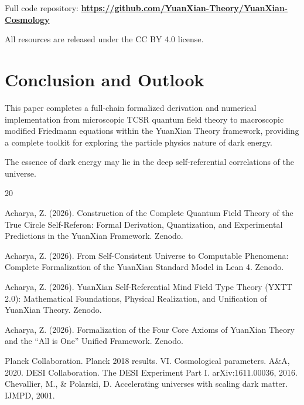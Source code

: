 \documentclass[12pt,a4paper]{article}
\begin{document}
Full code repository:  
\textbf{\url{https://github.com/YuanXian-Theory/YuanXian-Cosmology}}

All resources are released under the CC BY 4.0 license.

\section{Conclusion and Outlook}

This paper completes a full-chain formalized derivation and numerical implementation from microscopic TCSR quantum field theory to macroscopic modified Friedmann equations within the YuanXian Theory framework, providing a complete toolkit for exploring the particle physics nature of dark energy.

The essence of dark energy may lie in the deep self-referential correlations of the universe.

\begin{thebibliography}{20}

Acharya, Z. (2026). Construction of the Complete Quantum Field Theory of the True Circle Self-Referon: Formal Derivation, Quantization, and Experimental Predictions in the YuanXian Framework. Zenodo. 

Acharya, Z. (2026). From Self-Consistent Universe to Computable Phenomena: Complete Formalization of the YuanXian Standard Model in Lean 4. Zenodo. 

Acharya, Z. (2026). YuanXian Self-Referential Mind Field Type Theory (YXTT 2.0): Mathematical Foundations, Physical Realization, and Unification of YuanXian Theory. Zenodo. 

Acharya, Z. (2026). Formalization of the Four Core Axioms of YuanXian Theory and the ``All is One'' Unified Framework. Zenodo. 

 Planck Collaboration. Planck 2018 results. VI. Cosmological parameters. A\&A, 2020.
 DESI Collaboration. The DESI Experiment Part I. arXiv:1611.00036, 2016.
 Chevallier, M., \& Polarski, D. Accelerating universes with scaling dark matter. IJMPD, 2001.

\end{thebibliography}
\end{document}
